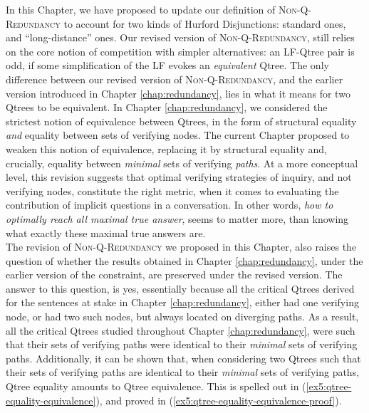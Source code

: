 In this Chapter, we have proposed to update our definition of \textsc{Non-Q-Redundancy} to account for two kinds of Hurford Disjunctions: standard ones, and ``long-distance'' ones. Our revised version of \textsc{Non-Q-Redundancy}, still relies on the core notion of competition with simpler alternatives: an LF-Qtree pair is odd, if some simplification of the LF evokes an \textit{equivalent} Qtree. The only difference between our revised version of \textsc{Non-Q-Redundancy}, and the earlier version introduced in Chapter \ref{chap:redundancy}, lies in what it means for two Qtrees to be equivalent. In Chapter \ref{chap:redundancy}, we considered the strictest notion of equivalence between Qtrees, in the form of structural equality \textit{and} equality between sets of verifying nodes. The current Chapter proposed to weaken this notion of equivalence, replacing it by structural equality and, crucially, equality between \textit{minimal} sets of verifying \textit{paths}. At a more conceptual level, this revision suggests that optimal verifying strategies of inquiry, and not verifying nodes, constitute the right metric, when it comes to evaluating the contribution of implicit questions in a conversation. In other words, \textit{how to optimally reach all maximal true answer}, seems to matter more, than knowing what exactly these maximal true answers are.\\

The revision of \textsc{Non-Q-Redundancy} we proposed in this Chapter, also raises the question of whether the results obtained in Chapter \ref{chap:redundancy}, under the earlier version of the constraint, are preserved under the revised version. The answer to this question, is yes, essentially because all the critical Qtrees derived for the sentences at stake in Chapter \ref{chap:redundancy}, either had one verifying node, or had two such nodes, but always located on diverging paths. As a result, all the critical Qtrees studied throughout Chapter \ref{chap:redundancy}, were such that their sets of verifying paths were identical to their \textit{minimal} sets of verifying paths. Additionally, it can be shown that, when considering two Qtrees such that their sets of verifying paths are identical to their \textit{minimal} sets of verifying paths, Qtree equality amounts to Qtree equivalence. This is spelled out in (\ref{ex5:qtree-equality-equivalence}), and proved in (\ref{ex5:qtree-equality-equivalence-proof}). 

